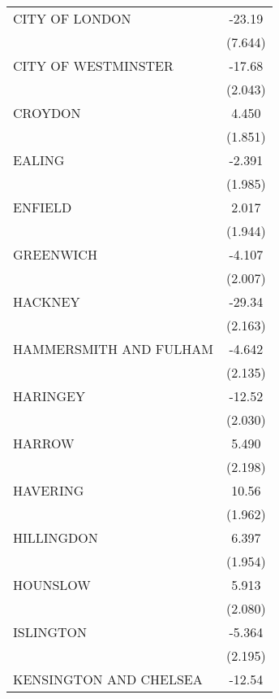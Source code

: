 {\begin{longtable}{l*{1}{c}}
\addlinespace
CITY OF LONDON      &      -23.19\sym{**} \\
                    &     (7.644)         \\
\addlinespace
CITY OF WESTMINSTER &      -17.68\sym{***}\\
                    &     (2.043)         \\
\addlinespace
CROYDON             &       4.450\sym{*}  \\
                    &     (1.851)         \\
\addlinespace
EALING              &      -2.391         \\
                    &     (1.985)         \\
\addlinespace
ENFIELD             &       2.017         \\
                    &     (1.944)         \\
\addlinespace
GREENWICH           &      -4.107\sym{*}  \\
                    &     (2.007)         \\
\addlinespace
HACKNEY             &      -29.34\sym{***}\\
                    &     (2.163)         \\
\addlinespace
HAMMERSMITH AND FULHAM&      -4.642\sym{*}  \\
                    &     (2.135)         \\
\addlinespace
HARINGEY            &      -12.52\sym{***}\\
                    &     (2.030)         \\
\addlinespace
HARROW              &       5.490\sym{*}  \\
                    &     (2.198)         \\
\addlinespace
HAVERING            &       10.56\sym{***}\\
                    &     (1.962)         \\
\addlinespace
HILLINGDON          &       6.397\sym{**} \\
                    &     (1.954)         \\
\addlinespace
HOUNSLOW            &       5.913\sym{**} \\
                    &     (2.080)         \\
\addlinespace
ISLINGTON           &      -5.364\sym{*}  \\
                    &     (2.195)         \\
\addlinespace
KENSINGTON AND CHELSEA&      -12.54\sym{***}\\

\end{longtable}}
